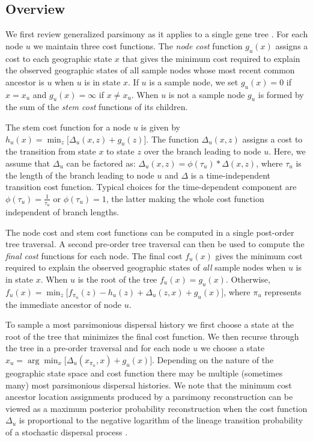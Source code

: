 \subsection{Overview}

We first review generalized parsimony as it applies to a single gene tree
\citep{Sankoff_1975, Sankoff_Rousseau_1975}. For each node $u$ we maintain
three cost functions. The \textit{node cost} function $g_u(x)$ assigns a cost 
to each geographic state $x$ that gives the minimum cost required to explain 
the observed geographic states of all sample nodes whose most recent common 
ancestor is $u$ when $u$ is in state  $x$. If $u$ is a sample node, we set 
$g_u(x) = 0$ if $x = x_u$ and $g_u(x) = \infty$ if $x \neq x_u$. When $u$ is 
not a sample node $g_u$ is formed by the sum of the \textit{stem cost} 
functions of its children.

The stem cost function for a node $u$ is given by
%
$h_u(x) = \min_z \bigl[ \Delta_u(x, z) + g_u(z) \bigr]$.
%
The function $\Delta_u(x, z)$ assigns a cost to the transition from state $x$ to
state $z$ over the branch leading to node $u$. Here, we assume that $\Delta_u$
can be factored as:
%
$\Delta_u(x,z) = \phi(\tau_u) * \Delta(x,z)$,
%
where $\tau_u$ is the length of the branch leading to node $u$ and $\Delta$ is
a time-independent transition cost function. Typical choices for the
time-dependent component are $\phi(\tau_u) = \frac{1}{\tau_u}$ or 
$\phi(\tau_u) = 1$, the latter making the whole cost function independent of
branch lengths.

The node cost and stem cost functions can be computed in a single post-order
tree traversal. A second pre-order tree traversal can then be used to compute
the \textit{final cost} functions for each node. The final cost $f_u(x)$
gives the minimum cost required to explain the observed geographic states of
\emph{all} sample nodes when $u$ is in state $x$. When $u$ is the root of the
tree $f_u(x) = g_u(x)$. Otherwise, 
%
$f_u(x) = \min_z \bigl[ f_{\pi_u}(z) - h_u(z) + \Delta_u(z,x) + g_u(x) \bigr]$,
%
where $\pi_u$ represents the immediate ancestor of node $u$.

To sample a most parsimonious dispersal history we first choose a state at the
root of the tree that minimizes the final cost function. We then recurse through 
the tree in a pre-order traversal and for each node $u$ we choose a state
$x_u = \arg\min_x \bigl[\Delta_u(x_{\pi_u}, x) + g_u(x)\bigr]$. Depending on the
nature of the geographic state space and cost function there may be multiple
(sometimes many) most parsimonious dispersal histories. We note that the 
minimum cost ancestor location assignments produced by a parsimony 
reconstruction can be viewed as a maximum posterior probability reconstruction 
when the cost function $\Delta_u$ is proportional to the negative logarithm of 
the lineage transition probability of a stochastic dispersal process 
\citep{Maddison_1991}.

